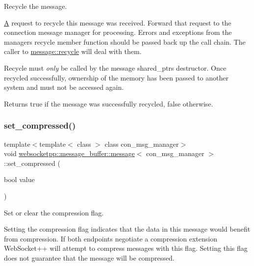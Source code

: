 Recycle the message. 

\mbox{\hyperlink{struct_a}{A}} request to recycle this message was received. Forward that request to the connection message manager for processing. Errors and exceptions from the manager\textquotesingle{}s recycle member function should be passed back up the call chain. The caller to \mbox{\hyperlink{classwebsocketpp_1_1message__buffer_1_1message_a2c19e247389598d9f81c9447ddcfba51}{message\+::recycle}} will deal with them.

Recycle must {\itshape only} be called by the message shared\+\_\+ptr\textquotesingle{}s destructor. Once recycled successfully, ownership of the memory has been passed to another system and must not be accessed again.

\begin{DoxyReturn}{Returns}
true if the message was successfully recycled, false otherwise. 
\end{DoxyReturn}
\mbox{\label{classwebsocketpp_1_1message__buffer_1_1message_addf63a081902e981a293823606b548cb}} 
\subsubsection{\texorpdfstring{set\+\_\+compressed()}{set\_compressed()}}
{\footnotesize\ttfamily template$<$template$<$ class $>$ class con\+\_\+msg\+\_\+manager$>$ \\
void \mbox{\hyperlink{classwebsocketpp_1_1message__buffer_1_1message}{websocketpp\+::message\+\_\+buffer\+::message}}$<$ con\+\_\+msg\+\_\+manager $>$\+::set\+\_\+compressed (\begin{DoxyParamCaption}\item[{bool}]{value }\end{DoxyParamCaption})\hspace{0.3cm}{\ttfamily [inline]}}



Set or clear the compression flag. 

Setting the compression flag indicates that the data in this message would benefit from compression. If both endpoints negotiate a compression extension Web\+Socket++ will attempt to compress messages with this flag. Setting this flag does not guarantee that the message will be compressed.


